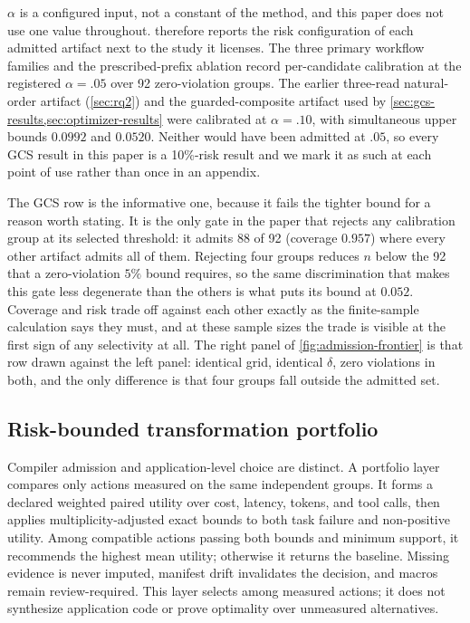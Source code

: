 $\alpha$ is a configured input, not a constant of the method, and this paper does not use
one value throughout.   therefore reports the risk
configuration of each admitted artifact next to the study it licenses.  The three primary
workflow families and the prescribed-prefix ablation record per-candidate calibration at
the registered $\alpha=.05$ over 92 zero-violation groups.  The earlier three-read natural-order artifact
(\cref{sec:rq2}) and the guarded-composite artifact used by
\cref{sec:gcs-results,sec:optimizer-results} were calibrated at $\alpha=.10$, with
simultaneous upper bounds $0.0992$ and $0.0520$.  Neither would have been admitted at
$.05$, so every GCS result in this paper is a 10\%-risk result and we mark it as such at
each point of use rather than once in an appendix.

The GCS row is the informative one, because it fails the tighter bound for a reason worth
stating.  It is the only gate in the paper that rejects any calibration group at its
selected threshold: it admits 88 of 92 (coverage $0.957$) where every other artifact
admits all of them.  Rejecting four groups reduces $n$ below the 92 that a zero-violation
$5\%$ bound requires, so the same discrimination that makes this gate less degenerate than
the others is what puts its bound at $0.052$.  Coverage and risk trade off against each
other exactly as the finite-sample calculation says they must, and at these sample sizes
the trade is visible at the first sign of any selectivity at all.  The right panel of
\cref{fig:admission-frontier} is that row drawn against the left panel: identical grid,
identical $\delta$, zero violations in both, and the only difference is that four groups
fall outside the admitted set.

\subsection{Risk-bounded transformation portfolio}
\label{sec:portfolio-method}

Compiler admission and application-level choice are distinct.  A portfolio layer compares
only actions measured on the same independent groups.  It forms a declared weighted paired
utility over cost, latency, tokens, and tool calls, then applies multiplicity-adjusted exact
bounds to both task failure and non-positive utility.  Among compatible actions passing
both bounds and minimum support, it recommends the highest mean utility; otherwise it
returns the baseline.  Missing evidence is never imputed, manifest drift invalidates the
decision, and macros remain review-required.  This layer selects among measured actions;
it does not synthesize application code or prove optimality over unmeasured alternatives.

